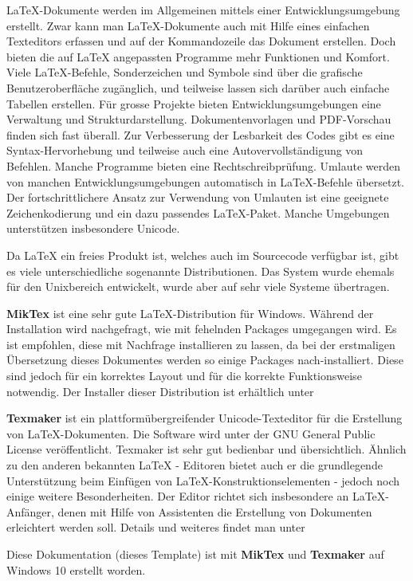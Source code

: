 LaTeX-Dokumente werden im Allgemeinen mittels einer Entwicklungsumgebung erstellt. Zwar kann man LaTeX-Dokumente auch mit Hilfe eines einfachen Texteditors erfassen und auf der Kommandozeile das Dokument erstellen. Doch bieten die auf LaTeX angepassten Programme mehr Funktionen und Komfort. Viele LaTeX-Befehle, Sonderzeichen und Symbole sind über die grafische Benutzeroberfläche zugänglich, und teilweise lassen sich darüber auch einfache Tabellen erstellen. Für grosse Projekte bieten Entwicklungsumgebungen eine Verwaltung und Strukturdarstellung. Dokumentenvorlagen und PDF-Vorschau finden sich fast überall. Zur Verbesserung der Lesbarkeit des Codes gibt es eine Syntax-Hervorhebung und teilweise auch eine Autovervollständigung von Befehlen. Manche Programme bieten eine Rechtschreibprüfung. Umlaute werden von manchen Entwicklungsumgebungen automatisch in LaTeX-Befehle übersetzt. Der fortschrittlichere Ansatz zur Verwendung von Umlauten ist eine geeignete Zeichenkodierung und ein dazu passendes LaTeX-Paket. Manche Umgebungen unterstützen insbesondere Unicode. 

Da LaTeX ein freies Produkt ist, welches auch im Sourcecode verfügbar ist, gibt es viele unterschiedliche sogenannte Distributionen. Das System wurde ehemals für den Unixbereich entwickelt, wurde aber auf sehr viele Systeme übertragen.

\textbf{MikTex} ist eine sehr gute LaTeX-Distribution für Windows. Während der Installation wird nachgefragt, wie mit fehelnden Packages umgegangen wird. Es ist empfohlen, diese mit Nachfrage installieren zu lassen, da bei der erstmaligen Übersetzung dieses Dokumentes werden so einige Packages nach-installiert. Diese sind jedoch für ein korrektes Layout und für die korrekte Funktionsweise notwendig. Der Installer dieser Distribution ist erhältlich unter  

\textbf{Texmaker} ist ein plattformübergreifender Unicode-Texteditor für die Erstellung von LaTeX-Dokumenten. Die Software wird unter der GNU General Public License ver\-öf\-fent\-licht. Texmaker ist sehr gut bedienbar und übersichtlich. Ähnlich zu den anderen bekannten LaTeX - Editoren bietet auch er die grundlegende Unterstützung beim Einfügen von LaTeX-Konstruktionselementen - jedoch noch einige weitere Besonderheiten. Der Editor richtet sich insbesondere an LaTeX-Anfänger, denen mit Hilfe von Assistenten die Erstellung von Dokumenten erleichtert werden soll. Details und weiteres findet man unter 

Diese Dokumentation (dieses Template) ist mit \textbf{MikTex} und \textbf{Texmaker} auf Windows 10 erstellt worden. 
